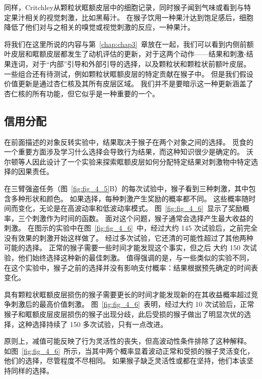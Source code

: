 同样，Critchley\cite{critchley1996hunger}从颗粒状眶额皮层中的细胞记录，同时猴子闻到气味或看到与特定果汁相关的视觉刺激，比如黑莓汁。
在猴子饮用一种果汁达到饱足感后，细胞降低了他们对与之相关的嗅觉或视觉刺激的反应，一种果汁。\par


将我们在这里所说的内容与第~\ref{chap:chap3}~章放在一起，我们可以看到内侧前额叶皮层和眶额皮层都发生了动机评估的更新，对于这两个动作——结果和刺激-结果连词，对于“内部”引导和外部引导的选择，以及颗粒状和颗粒状前额叶皮层。
一些组合还有待测试，例如颗粒状眶额皮层的特定贡献在猴子中。
但是我们假设价值更新是通过杏仁核及其所有皮层区域。
我们并不是要暗示这一种更新涵盖了杏仁核的所有功能，但它似乎是一种重要的一个。\par



\subsection{信用分配}

在前面描述的对象反转实验中，结果取决于猴子在两个对象之间的选择。
觅食的一个重要方面涉及学习什么选择会导致行为结果，而这种知识很少是确定的。
沃尔顿等人\cite{walton2010separable}因此设计了一个实验来探索眶额皮层如何分配特定结果对刺激物中特定选择的因果责任。\par


在三臂强盗任务（图~\ref{fig:fig_4_5}B）的每次试验中，猴子看到三种刺激，其中包含多种形状和颜色。
如果选择，每种刺激产生奖励的概率都不同。
这些概率随时间而变化，无论是在高波动率和低波动率模式。
图~\ref{fig:fig_4_6}~显示了奖励概率，三个刺激作为时间的函数。
面对这个问题，猴子通常会选择产生最大收益的刺激。
在图示的实验中在图~\ref{fig:fig_4_6}~中，经过大约 145 次试验后，之前完全没有效果的刺激开始这样做了。
经过多次试验，它还清的可能性超过了其他两种可能的选择。
正常的猴子需要一些时间才能发现这个事实，但之后
大约 150 次试验，他们始终选择这种新的最佳刺激。
值得强调的是，与一些类似的实验不同，在这个实验中，猴子之前的选择并没有影响支付概率：结果根据预先确定的时间表变化。\par


具有颗粒状眶额皮层损伤的猴子需要更长的时间才能发现新的在其收益概率超过竞争刺激后的最高价值刺激。
图~\ref{fig:fig_4_6}~表明，经过大约 10 次试验后，正常猴子和眶额皮层皮层损伤的猴子出现分歧，此后受损的猴子做出了明显次优的选择，这种选择持续了 150 多次试验，只有一点改进。\par


原则上，减值可能反映了行为灵活性的丧失，但高波动性条件排除了这种解释。
如图~\ref{fig:fig_4_6}~所示，当其中两个概率显着波动正常和受损的猴子灵活变化，他们的选择，尽管程度不尽相同。
如果猴子缺乏灵活性或都在坚持，他们本该坚持同样的选择。\par


